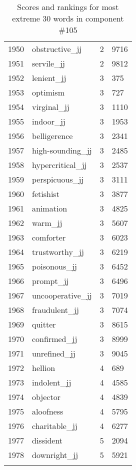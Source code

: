 \begin{longtable}[!htbp]{| rlr@{.}l |}
    1950 & obstructive\_jj & 2 & 9716 \\
    1951 & servile\_jj & 2 & 9812 \\
    1952 & lenient\_jj & 3 & 375 \\
    1953 & optimism & 3 & 727 \\
    1954 & virginal\_jj & 3 & 1110 \\
    1955 & indoor\_jj & 3 & 1953 \\
    1956 & belligerence & 3 & 2341 \\
    1957 & high-sounding\_jj & 3 & 2485 \\
    1958 & hypercritical\_jj & 3 & 2537 \\
    1959 & perspicuous\_jj & 3 & 3111 \\
    1960 & fetishist & 3 & 3877 \\
    1961 & animation & 3 & 4825 \\
    1962 & warm\_jj & 3 & 5607 \\
    1963 & comforter & 3 & 6023 \\
    1964 & trustworthy\_jj & 3 & 6219 \\
    1965 & poisonous\_jj & 3 & 6452 \\
    1966 & prompt\_jj & 3 & 6496 \\
    1967 & uncooperative\_jj & 3 & 7019 \\
    1968 & fraudulent\_jj & 3 & 7074 \\
    1969 & quitter & 3 & 8615 \\
    1970 & confirmed\_jj & 3 & 8999 \\
    1971 & unrefined\_jj & 3 & 9045 \\
    1972 & hellion & 4 & 689 \\
    1973 & indolent\_jj & 4 & 4585 \\
    1974 & objector & 4 & 4839 \\
    1975 & aloofness & 4 & 5795 \\
    1976 & charitable\_jj & 4 & 6277 \\
    1977 & dissident & 5 & 2094 \\
    1978 & downright\_jj & 5 & 5921 \\
    \hline
    \caption{Scores and rankings for most extreme 30 words in component \#105} \\
\end{longtable}
